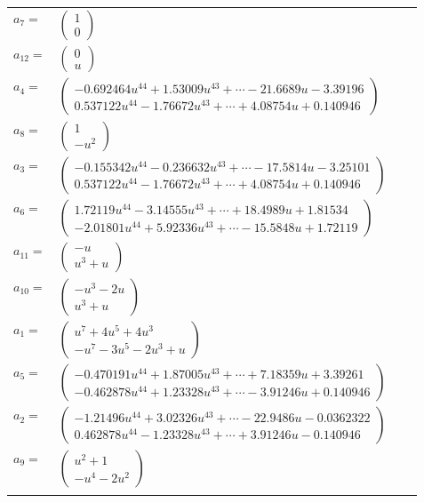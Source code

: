 \documentclass[1p]{elsarticle_modified}
\theoremstyle{definition}
\begin{document}
\begin{tabular}{m{7pt} m{180pt} m{7pt} m{180pt} }
\flushright $a_{7}=$&$\begin{pmatrix}1\\0\end{pmatrix}$ \\
\flushright $a_{12}=$&$\begin{pmatrix}0\\u\end{pmatrix}$ \\
\flushright $a_{4}=$&$\begin{pmatrix}-0.692464 u^{44}+1.53009 u^{43}+\cdots-21.6689 u-3.39196\\0.537122 u^{44}-1.76672 u^{43}+\cdots+4.08754 u+0.140946\end{pmatrix}$ \\
\flushright $a_{8}=$&$\begin{pmatrix}1\\- u^2\end{pmatrix}$ \\
\flushright $a_{3}=$&$\begin{pmatrix}-0.155342 u^{44}-0.236632 u^{43}+\cdots-17.5814 u-3.25101\\0.537122 u^{44}-1.76672 u^{43}+\cdots+4.08754 u+0.140946\end{pmatrix}$ \\
\flushright $a_{6}=$&$\begin{pmatrix}1.72119 u^{44}-3.14555 u^{43}+\cdots+18.4989 u+1.81534\\-2.01801 u^{44}+5.92336 u^{43}+\cdots-15.5848 u+1.72119\end{pmatrix}$ \\
\flushright $a_{11}=$&$\begin{pmatrix}- u\\u^3+u\end{pmatrix}$ \\
\flushright $a_{10}=$&$\begin{pmatrix}- u^3-2 u\\u^3+u\end{pmatrix}$ \\
\flushright $a_{1}=$&$\begin{pmatrix}u^7+4 u^5+4 u^3\\- u^7-3 u^5-2 u^3+u\end{pmatrix}$ \\
\flushright $a_{5}=$&$\begin{pmatrix}-0.470191 u^{44}+1.87005 u^{43}+\cdots+7.18359 u+3.39261\\-0.462878 u^{44}+1.23328 u^{43}+\cdots-3.91246 u+0.140946\end{pmatrix}$ \\
\flushright $a_{2}=$&$\begin{pmatrix}-1.21496 u^{44}+3.02326 u^{43}+\cdots-22.9486 u-0.0362322\\0.462878 u^{44}-1.23328 u^{43}+\cdots+3.91246 u-0.140946\end{pmatrix}$ \\
\flushright $a_{9}=$&$\begin{pmatrix}u^2+1\\- u^4-2 u^2\end{pmatrix}$\\&\end{tabular}
\end{document}
